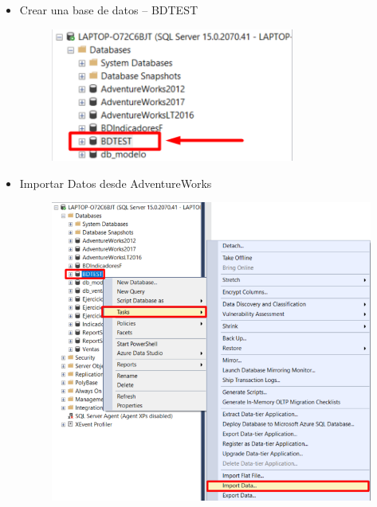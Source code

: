 \documentclass[12pt,letterpaper]{article}
\begin{document}
\begin{itemize}
\item Crear una base de datos – BDTEST
	\begin{figure}[htb]
		\begin{center}
			\includegraphics[width=8cm]{./IMAGENES/Tarea1_1}
			
		\end{center}
	\end{figure}
\item Importar Datos desde AdventureWorks
	\begin{figure}[htb]
		\begin{center}
			\includegraphics[width=13cm]{./IMAGENES/Tarea1_2}
			
		\end{center}
	\end{figure}

\newpage



\end{itemize}
\end{document}

